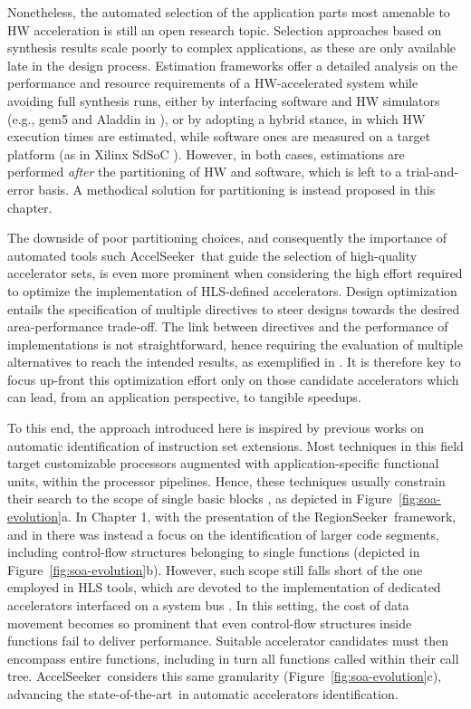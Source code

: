 \documentclass[]{usiinfthesis}
\newcommand{\aseeker}{{AccelSeeker}}
\newcommand{\rseeker}{{RegionSeeker}}
\newcommand{\SoTA}{{state-of-the-art}}
\begin{document}
Nonetheless, the automated selection of the application parts most
amenable to HW acceleration is still an open research topic.
Selection approaches based on synthesis results \cite{CanisSep13b}
scale poorly to complex applications, as these are only available late
in the design process.  Estimation frameworks offer a detailed
analysis on the performance and resource requirements of a
HW-accelerated system while avoiding full synthesis runs, either
by interfacing software and HW simulators (e.g., gem5
\cite{BinkertFeb11} and Aladdin \cite{ShaoJul14} in \cite{ShaoOct16}),
or by adopting a hybrid stance, in which HW execution times are
estimated, while software ones are measured on a target platform (as
in Xilinx SdSoC \cite{KathailFeb16}). However, in both cases,
estimations are performed \emph{after} the partitioning of HW
and software, which is left to a trial-and-error basis.
A methodical solution for partitioning is instead proposed in this
chapter.\par

The downside of poor partitioning choices, and consequently the
importance of automated tools such \aseeker\ that guide the selection
of high-quality accelerator sets, is even more prominent when
considering the high effort required to optimize the implementation of
HLS-defined accelerators. Design optimization entails the
specification of multiple directives to steer designs towards the
desired area-performance trade-off. The link between directives and
the performance of implementations is not straightforward, hence
requiring the evaluation of multiple alternatives to reach the
intended results, as exemplified in \cite{SchaferJun12}
\cite{ZuluagaJun12} \cite{FerrettiJan18} \cite{LiuJun13}. It is
therefore key to focus up-front this optimization effort only on those
candidate accelerators which can lead, from an application
perspective, to tangible speedups.\par

To this end, the approach introduced here is inspired by previous works 
on automatic
identification of instruction set extensions. Most techniques in this
field target customizable processors augmented with
application-specific functional units, within the processor pipelines.
Hence, these techniques usually constrain their search to the scope of
single basic blocks \cite{PozziJul06} \cite{GiaquintaMar15}, as
depicted in Figure~\ref{fig:soa-evolution}a. In Chapter 1, with the 
presentation of the \rseeker\ framework, and in \cite{OppermannJul16} 
there was instead a focus on the identification of larger code segments, including
control-flow structures belonging to single functions (depicted in
Figure~\ref{fig:soa-evolution}b).  However, such scope still falls
short of the one employed in HLS tools, which are devoted to the
implementation of dedicated accelerators interfaced on a system bus
\cite{CotaJun15}. In this setting, the cost of data movement becomes
so prominent that even control-flow structures inside functions fail
to deliver performance. Suitable accelerator candidates must then
encompass entire functions, including in turn all functions called
within their call tree. \aseeker\ considers this same granularity
(Figure~\ref{fig:soa-evolution}c), advancing the \SoTA\ in
automatic accelerators identification.
\end{document}
